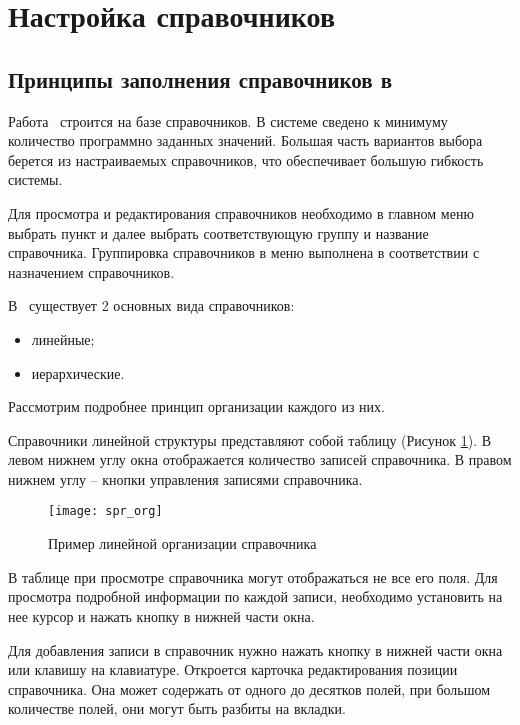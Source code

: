 \newpage
\section{Настройка справочников}

\subsection{Принципы заполнения справочников в \tmis}

Работа \tmis~строится на базе справочников. В системе сведено к минимуму количество программно заданных значений. Большая часть вариантов выбора берется из настраиваемых справочников, что обеспечивает большую гибкость системы.

Для просмотра и редактирования справочников необходимо в главном меню выбрать пункт  и далее выбрать соответствующую группу и название справочника. Группировка справочников в меню выполнена в соответствии с назначением справочников.

В \tmis~существует 2 основных вида справочников:
\begin{itemize}
 \item линейные;
 \item иерархические.
\end{itemize}

Рассмотрим подробнее принцип организации каждого из них.

Справочники линейной структуры представляют собой таблицу (Рисунок \ref{img_spr_org}). В левом нижнем углу окна отображается количество записей справочника. В правом нижнем углу – кнопки управления записями справочника.

\begin{figure}[ht]\centering
 \texttt{[image: spr\_org]}
 \caption{Пример линейной организации справочника}
 \label{img_spr_org}
\end{figure}

\begin{prim}
 В таблице при просмотре справочника могут отображаться не все его поля. Для просмотра подробной информации по каждой записи, необходимо установить на нее курсор и нажать кнопку   в нижней части окна.
\end{prim}
 
Для добавления записи в справочник нужно нажать кнопку  в нижней части окна или клавишу  на клавиатуре. Откроется карточка редактирования позиции справочника. Она может содержать от одного до десятков полей, при большом количестве полей, они могут быть разбиты на вкладки. 

